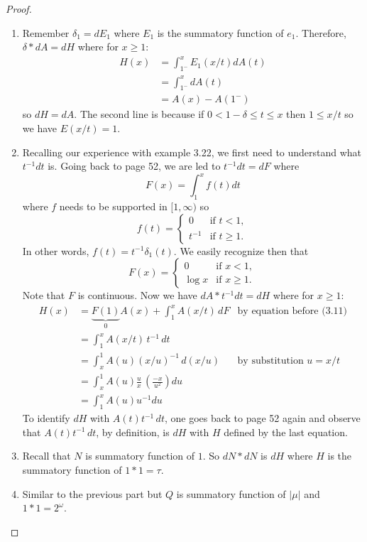 \documentclass{article}
\begin{document}
\begin{proof}
\begin{enumerate}
\item Remember $\delta_1 = d E_1$ where $E_1$ is the summatory function of $e_1$. Therefore, $\delta * dA = dH$ where for $x \geq 1$:
\begin{align*}
H(x) &= \int_{1^-}^x E_1(x/t) dA(t)\\
&= \int_{1^-}^x dA(t)\\
&= A(x) - A(1^-)
\end{align*}
so $dH = dA$. The second line is because if $0 < 1 - \delta \leq t \leq x$ then $1 \leq x/t$ so we have $E(x/t) = 1$.

\item Recalling our experience with example 3.22, we first need to understand what $t^{-1} dt$ is. Going back to page 52, we are led to $t^{-1} dt = d F$ where
$$F(x) = \int_1^x f(t) dt$$
where $f$ needs to be supported in $[1, \infty)$ so
$$f(t) = \begin{cases}
0 &\text{if } t < 1,\\
t^{-1} &\text{if } t \geq 1.
\end{cases}$$
In other words, $f(t) = t^{-1} \delta_1 (t)$. We easily recognize then that
$$F(x) = \begin{cases}
0 &\text{if } x < 1,\\
\log x &\text{if } x \geq 1.
\end{cases}$$
Note that $F$ is continuous. Now we have $dA * t^{-1} dt = d H$ where for $x \geq 1$:
\begin{align*}
H(x) &= \underbrace{F(1)}_{0} A(x) + \int_1^x A(x/t) \, dF &\text{by equation before (3.11)}\\
&= \int_1^x A(x/t) \, t^{-1} \, dt\\
&= \int_x^1 A(u) (x/u)^{-1} \, d (x/u) &\text{by substitution } u = x/t\\
&= \int_x^1 A(u) \frac ux \, \left( \frac{-x}{u^2} \right) du\\
&= \int_1^x A(u) u^{-1} du
\end{align*}
To identify $dH$ with $A(t) t^{-1} \, dt$, one goes back to page 52 again and observe that $A(t) t^{-1} \, dt$, by definition, is $dH$ with $H$ defined by the last equation.

\item Recall that $N$ is summatory function of $1$. So $dN * dN$ is $dH$ where $H$ is the summatory function of $1 * 1 = \tau$.

\item Similar to the previous part but $Q$ is summatory function of $|\mu|$ and $1 * 1 = 2^\omega$.


\end{enumerate}
\end{proof}
\end{document}

